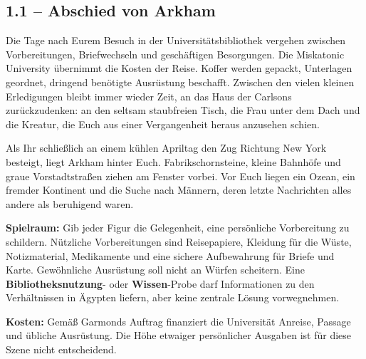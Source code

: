 \subsection{1.1 -- Abschied von Arkham}
\begin{vorlesetextalle}
Die Tage nach Eurem Besuch in der Universitätsbibliothek vergehen zwischen Vorbereitungen, Briefwechseln und geschäftigen Besorgungen. Die Miskatonic University übernimmt die Kosten der Reise. Koffer werden gepackt, Unterlagen geordnet, dringend benötigte Ausrüstung beschafft. Zwischen den vielen kleinen Erledigungen bleibt immer wieder Zeit, an das Haus der Carlsons zurückzudenken: an den seltsam staubfreien Tisch, die Frau unter dem Dach und die Kreatur, die Euch aus einer Vergangenheit heraus anzusehen schien.

Als Ihr schlie\ss{}lich an einem kühlen Apriltag den Zug Richtung New York besteigt, liegt Arkham hinter Euch. Fabrikschornsteine, kleine Bahnhöfe und graue Vorstadtstra\ss{}en ziehen am Fenster vorbei. Vor Euch liegen ein Ozean, ein fremder Kontinent und die Suche nach Männern, deren letzte Nachrichten alles andere als beruhigend waren.
\end{vorlesetextalle}
\begin{meisterinfo}
\textbf{Spielraum:} Gib jeder Figur die Gelegenheit, eine persönliche Vorbereitung zu schildern. Nützliche Vorbereitungen sind Reisepapiere, Kleidung für die Wüste, Notizmaterial, Medikamente und eine sichere Aufbewahrung für Briefe und Karte. Gewöhnliche Ausrüstung soll nicht an Würfen scheitern. Eine \textbf{Bibliotheksnutzung}- oder \textbf{Wissen}-Probe darf Informationen zu den Verhältnissen in Ägypten liefern, aber keine zentrale Lösung vorwegnehmen.

\textbf{Kosten:} Gemä\ss{} Garmonds Auftrag finanziert die Universität Anreise, Passage und übliche Ausrüstung. Die Höhe etwaiger persönlicher Ausgaben ist für diese Szene nicht entscheidend.
\end{meisterinfo}

